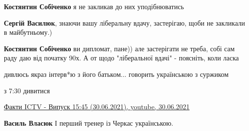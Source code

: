 \begin{itemize}
\begin{itemize}
\textbf{Костянтин Собіченко} я не закликав до них уподібнюватись

 
\textbf{Сергій Василюк}, знаючи вашу ліберальну вдачу, застерігаю, щоби не закликали в майбутньому.)

 
\textbf{Костянтин Собіченко} ви дипломат, пане)) але застерігати не треба, собі сам раду даю від початку 90х. А от щодо "ліберальної вдачі" - поясніть, коли ласка

\end{itemize}

 

дивлюсь якраз інтерв*ю з його батьком... говорить українською з суржиком

\begin{itemize}
 
з 7:30 дивитися

\href{https://www.youtube.com/watch?v=lNPrjVEaa1Y}{%
Факти ICTV - Випуск 15:45 (30.06.2021), youtube, 30.06.2021%
}

 
\textbf{Василь Власюк} І перший тренер із Черкас українською.

\end{itemize}


\end{itemize}
